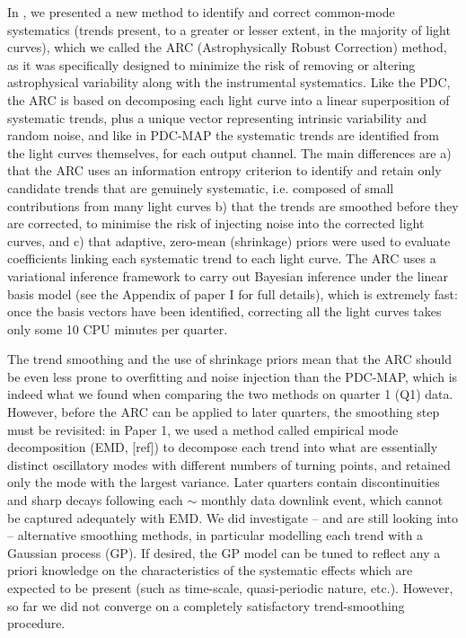\documentclass[useAMS,usenatbib]{mn2e}
\begin{document}
In \citet[][hereafter Paper I]{rob+13}, we presented a new method to
identify and correct common-mode systematics (trends present, to a
greater or lesser extent, in the majority of light curves), which we
called the ARC (Astrophysically Robust Correction) method, as it was
specifically designed to minimize the risk of removing or altering
astrophysical variability along with the instrumental
systematics. Like the PDC, the ARC is based on decomposing each light
curve into a linear superposition of systematic trends, plus a unique
vector representing intrinsic variability and random noise, and like
in PDC-MAP the systematic trends are identified from the light curves
themselves, for each output channel. The main differences are a) that
the ARC uses an information entropy criterion to identify and retain
only candidate trends that are genuinely systematic, i.e. composed of
small contributions from many light curves b) that the trends are
smoothed before they are corrected, to minimise the risk of
injecting noise into the corrected light curves, and c) that adaptive,
zero-mean (shrinkage) priors were used to evaluate coefficients
linking each systematic trend to each light curve. The ARC uses a
variational inference framework to carry out Bayesian inference under the linear basis
model (see the Appendix of paper I for full details), which is
extremely fast: once the basis vectors have been identified,
correcting all the light curves takes only some 10 CPU minutes per quarter.

The trend smoothing and the use of shrinkage priors mean that the ARC should be
even less prone to overfitting and noise injection than the PDC-MAP,
which is indeed what we found when comparing the two methods on
quarter 1 (Q1) data. However, before the ARC can be applied to later
quarters, the smoothing step must be revisited: in Paper 1, we used a
method called empirical mode decomposition (EMD, [ref]) to decompose
each trend into what are essentially distinct oscillatory modes with
different numbers of turning points, and retained only the mode with
the largest variance. Later quarters contain discontinuities and sharp
decays following each $\sim$ monthly data downlink event, which cannot
be captured adequately with EMD. We did investigate -- and are still
looking into -- alternative smoothing methods, in particular
modelling each trend with a Gaussian process (GP). If desired, the GP
model can be tuned to reflect any a priori knowledge on the
characteristics of the systematic effects which are expected to be
present (such as time-scale, quasi-periodic nature,
etc.). However, so far we did not converge on a completely
satisfactory trend-smoothing procedure.
\end{document}
